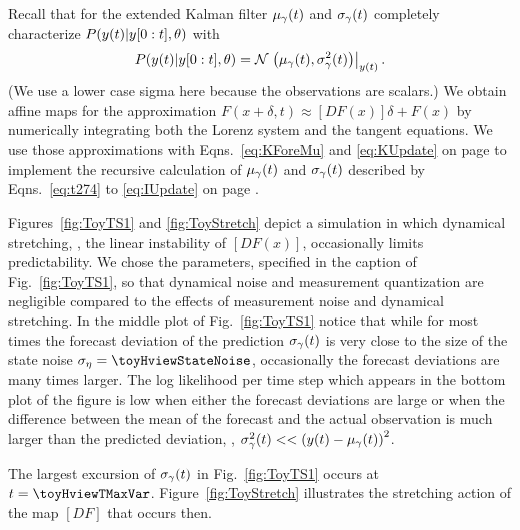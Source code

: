 Recall that for the extended Kalman filter ${\mu_\gamma}{(t)}$ and
${\sigma_\gamma}{(t)}$ completely characterize
$ P({y}{(t)}|y[0:t],\theta)$ with
\begin{equation*}
  P({y}{(t)}|y[0:t],\theta) =
  {\mathcal{N}}\left.\left({\mu_\gamma}{(t)},{\sigma^2_\gamma}{(t)}\right)\right|_{{y}{(t)}}.
\end{equation*}
(We use a lower case sigma here because the observations are scalars.)
We obtain affine maps for the approximation $F(x+\delta,t) \approx
\left[ DF(x)\right]\delta + F(x)$ %
%
by numerically integrating both the Lorenz system and the tangent
equations.  We use those approximations with Eqns.~\eqref{eq:KForeMu}
and \eqref{eq:KUpdate} on page \pageref{eq:KUpdate} to implement the
recursive calculation of ${\mu_\gamma}{(t)}$ and
${\sigma_\gamma}{(t)}$ described by Eqns.~\eqref{eq:t274} to
\eqref{eq:IUpdate} on page \pageref{eq:IUpdate}.

Figures~\ref{fig:ToyTS1} and \ref{fig:ToyStretch} depict a simulation
in which dynamical stretching, \ie, the linear instability of
$\left[ DF(x)\right]$, occasionally limits predictability.  We chose
the parameters, specified in the caption of Fig.~\ref{fig:ToyTS1}, so
that dynamical noise and measurement quantization are negligible
compared to the effects of measurement noise and dynamical stretching.
In the middle plot of Fig.~\ref{fig:ToyTS1} notice that while for most
times the forecast deviation of the prediction ${\sigma_\gamma}{(t)}$
is very close to the size of the state noise
$\sigma_\eta = \toyHviewStateNoise$, occasionally the forecast
deviations are many times larger.  The log likelihood per time step
which appears in the bottom plot of the figure is low when either the
forecast deviations are large or when the difference between the mean
of the forecast and the actual observation is much larger than the
predicted deviation, \ie,
${\sigma^2_\gamma}{(t)} <<
\left({y}{(t)}-{\mu_\gamma}{(t)}\right)^2$.

The largest excursion of ${\sigma_\gamma}{(t)}$ in
Fig.~\ref{fig:ToyTS1} occurs at $t=\toyHviewTMaxVar$.
Figure~\ref{fig:ToyStretch} illustrates the stretching action of the
map $[DF]$ that occurs then.

